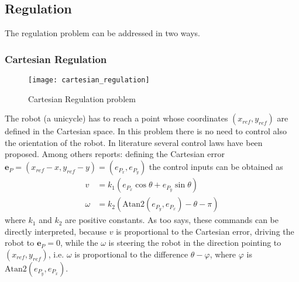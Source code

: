 \subsection{Regulation}
The regulation problem can be addressed in two ways.
\subsubsection{Cartesian Regulation}
\begin{figure}[h!]
	\centering
	\texttt{[image: cartesian\_regulation]}
	\caption{Cartesian Regulation problem}
	\label{cartregulation} 
\end{figure}
The robot (a unicycle) has to reach a point whose coordinates $(x_{ref},y_{ref})$ are defined in the Cartesian space. In this problem there is no need to control also the orientation of the robot. 
In literature several control laws have been proposed. Among others \cite{siciliano} reports: defining the Cartesian error $\mathbf{e}_P=(x_{ref}-x,y_{ref}-y)=(e_{P_x},e_{P_y})$ the control inputs can be obtained as
\begin{align}
	v &= k_1(e_{P_x}\cos\theta+e_{P_y}\sin\theta)\\
	\omega &= k_2\left(\text{Atan2}\left(e_{P_y},e_{P_x}\right)-\theta-\pi\right)
\end{align}
where $k_1$ and $k_2$ are positive constants. 
As \cite{siciliano} too says, these commands can be directly interpreted, because $v$ is proportional to the Cartesian error, driving the robot to $\mathbf{e}_P=0$, while the $\omega$ is steering the robot in the direction pointing to $(x_{ref},y_{ref})$, i.e. $\omega$ is proportional to the difference $\theta-\varphi$, where $\varphi$ is $\text{Atan2}\left(e_{P_y},e_{P_x}\right)$.
